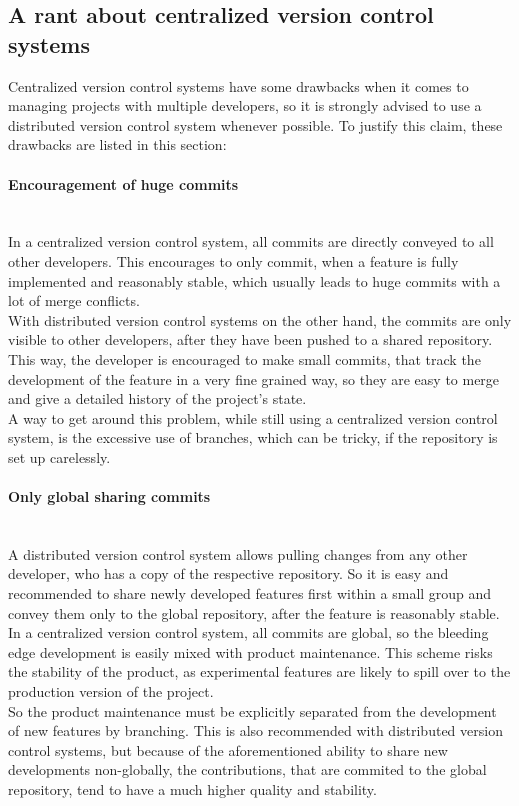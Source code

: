 		\subsection{A rant about centralized version control systems}
			\label{CentralizedVersionControlRant}
			Centralized version control systems have some drawbacks when it comes to managing projects with multiple developers, so it is strongly advised to use a distributed version control system whenever possible.
			To justify this claim, these drawbacks are listed in this section:

			\paragraph{Encouragement of huge commits}~\\
				In a centralized version control system, all commits are directly conveyed to all other developers.
				This encourages to only commit, when a feature is fully implemented and reasonably stable, which usually leads to huge commits with a lot of merge conflicts.\\
				With distributed version control systems on the other hand, the commits are only visible to other developers, after they have been pushed to a shared repository.
				This way, the developer is encouraged to make small commits, that track the development of the feature in a very fine grained way, so they are easy to merge and give a detailed history of the project's state.\\
				A way to get around this problem, while still using a centralized version control system, is the excessive use of branches, which can be tricky, if the repository is set up carelessly.

			\paragraph{Only global sharing commits}~\\
				A distributed version control system allows pulling changes from any other developer, who has a copy of the respective repository.
				So it is easy and recommended to share newly developed features first within a small group and convey them only to the global repository, after the feature is reasonably stable.\\
				In a centralized version control system, all commits are global, so the bleeding edge development is easily mixed with product maintenance.
				This scheme risks the stability of the product, as experimental features are likely to spill over to the production version of the project.\\
				So the product maintenance must be explicitly separated from the development of new features by branching.
				This is also recommended with distributed version control systems, but because of the aforementioned ability to share new developments non-globally, the contributions, that are commited to the global repository, tend to have a much higher quality and stability.

